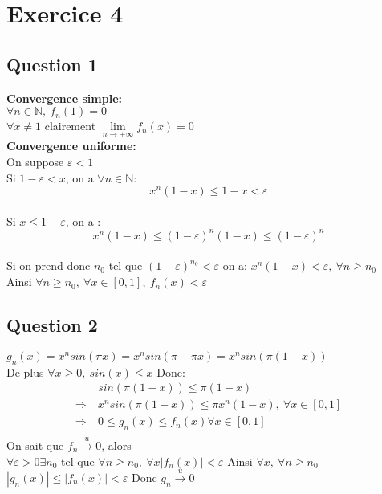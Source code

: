 \documentclass[td5.tex]{subfiles}
\begin{document}
\section{Exercice 4}
\subsection*{Question 1}

  \textbf{Convergence simple:}\\
  $\forall n \in \mathbb{N},~f_n(1) = 0$ \\
  $\forall x \ne 1$ clairement $\lim\limits_{n \to +\infty}f_n(x) = 0$\\
  \textbf{Convergence uniforme:}\\
  On suppose $\varepsilon < 1$\\
  Si $1 - \varepsilon < x$, on a $\forall n \in \mathbb{N}$:\\
  $$x^n(1-x)\leq 1 - x < \varepsilon$$\\
  Si $x \leq 1 - \varepsilon$, on a :
  $$x^n(1-x) \leq (1-\varepsilon)^n(1-x) \leq (1-\varepsilon)^n$$\\
  Si on prend donc $n_0$ tel que $(1-\varepsilon)^{n_0} < \varepsilon$ on a:
  $x^n(1-x) < \varepsilon,~\forall n \geq n_0 $\\
  Ainsi $\forall n \geq n_0,~\forall x \in [0, 1],~f_n(x) < \varepsilon$

\subsection{Question 2}
$g_n(x) = x^n sin(\pi x) = x^n sin(\pi - \pi x) = x^n sin(\pi(1-x))$\\
De plus $\forall x \geq 0,~ sin(x) \leq x$ Donc: \\
\begin{align*}
  &sin(\pi (1-x)) \leq \pi (1-x)  \\
  \Rightarrow ~&x^n sin (\pi(1-x)) \leq \pi x^n (1-x),~ \forall x \in [0, 1] \\
  \Rightarrow ~&0 \leq g_n(x) \leq f_n(x) \forall x \in [0, 1]\\
\end{align*}
On sait que $f_n \xrightarrow{u} 0$, alors \\
$\forall \varepsilon > 0 \exists n_0$ tel que $\forall n \geq n_0,~\forall x |f_n(x)| < \varepsilon$
Ainsi $\forall x, ~\forall n \geq n_0$\\
$|g_n(x)| \leq |f_n(x)| < \varepsilon$
Donc $g_n \xrightarrow{u} 0$
\end{document}
